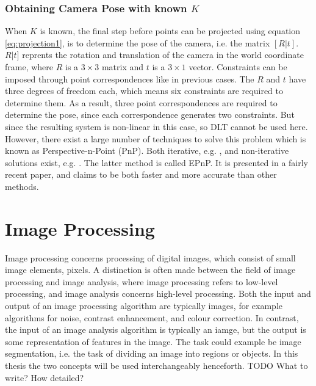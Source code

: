 \subsubsection{Obtaining Camera Pose with known $K$} \label{camera-pose}
When $K$ is known, the final step before points can be projected using equation \ref{eq:projection1}, is to determine the pose of the camera, i.e. the matrix $[R|t]$. $R|t]$ reprents the rotation and translation of the camera in the world coordinate frame, where $R$ is a $3 \times 3$ matrix and $t$ is a $3 \times 1$ vector.
Constraints can be imposed through point correspondences like in previous cases.
The $R$ and $t$ have three degrees of freedom each, which means six constraints are required to determine them.
As a result, three point correspondences are required to determine the pose, since each correspondence generates two constraints.
But since the resulting system is non-linear in this case, so DLT cannot be used here. \cite[187]{hartley-zisserman}
However, there exist a large number of techniques to solve this problem which is known as Perspective-n-Point (PnP).
Both iterative, e.g. \cite{hesch-pnp} \cite{oberkampf-pnp}, and non-iterative solutions exist, e.g. \cite{quan-pnp} \cite{lepetit-pnp}.
The latter method is called EPnP.
It is presented in a fairly recent paper, and claims to be both faster and more accurate than other methods. 

\section{Image Processing}
Image processing concerns processing of digital images, which consist of small image elements, pixels.
A distinction is often made between the field of image processing and image analysis, where image processing refers to low-level processing, and image analysis concerns high-level processing.
Both the input and output of an image processing algorithm are typically images, for example algorithms for noise, contrast enhancement, and colour correction. 
In contrast, the input of an image analysis algorithm is typically an iamge, but the output is some representation of features in the image.
The task could example be image segmentation, i.e. the task of dividing an image into regions or objects.\cite[p. 1-2]{pitas}\cite[p. 1-2]{gonzalez-woods}
In this thesis the two concepts will be used interchangeably henceforth.
TODO What to write? How detailed?%

















